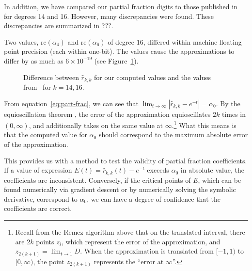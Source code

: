 
In addition, we have compared our partial fraction digits to those published
in~\cite{pusa2012correction} for degrees 14 and 16. However, many
discrepancies were found. These discrepancies are summarized in {\color{red}
  ???}.

Two values, $\mathrm{re}(\alpha_4)$ and $\mathrm{re}(\alpha_6)$ of degree 16,
differed within machine floating point precision (each within one-bit). The
values cause the approximations to differ by as much as $6\times10^{-19}$ (see
Figure~\ref{fig:pusa-differences}).

\begin{figure}[!ht]
\centering
\resizebox{0.9\textwidth}{!}{}
\caption{Difference between $\hat{r}_{k,k}$ for our computed values and the
  values from~ for $k=14,16$.}
\label{fig:pusa-differences}
\end{figure}

From equation~\ref{eq:part-frac}, we can see that
$\lim_{t\to\infty}{\left|\hat{r}_{k,k} - e^{-t}\right|} = \alpha_0$. By the
equioscillation theorem , the error of the approximation equioscillates $2k$ times
in $(0, \infty)$, and additionally takes on the same value at $\infty$.\footnote{Recall
from the Remez algorithm above that on the translated interval, there are $2k$
points $z_i$, which represent the error of the approximation, and
$z_{2(k+1)}=\lim_{t\to 1}{D}$. When the approximation is translated from $[-1,
1)$ to $[0, \infty)$, the point $z_{2(k + 1)}$ represents the ``error at
$\infty$''.} What this means is that the computed value for $\alpha_0$ should
correspond to the maximum absolute error of the approximation.

This provides us with a method to test the validity of partial fraction
coefficients. If a value of expression $E(t) = \hat{r}_{k,k}(t) - e^{-t}$
exceeds $\alpha_0$ in absolute value, the coefficients are inconsistent.
Conversely, if the critical points of $E$, which can be found numerically via
gradient descent or by numerically solving the symbolic derivative, correspond
to $\alpha_0$, we can have a degree of confidence that the coefficients are
correct.

